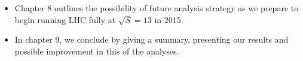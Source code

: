 \begin{itemize}
\item Chapter 8 outlines the possibility of future analysis strategy as we prepare to begin running LHC fully at $\sqrt{S} = 13$ \TeV in 2015. 


\item  In chapter 9, we conclude by giving a summary, presenting our results and possible improvement in this of the analyses.

\end{itemize}






